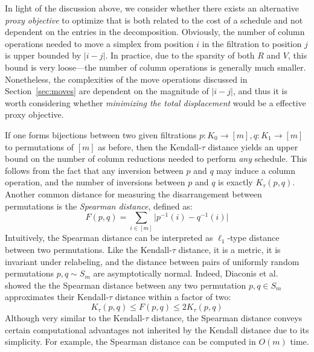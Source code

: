 \documentclass[sn-mathphys]{sn-jnl}
\DeclareMathOperator*{\argmin}{arg\,min}
\begin{document}
In light of the discussion above, we consider whether there exists an alternative \emph{proxy objective} to optimize that is both related to the cost of a schedule and not dependent on the entries in the decomposition. 
Obviously, the number of column operations needed to move a simplex from position $i$ in the filtration to position $j$ is upper bounded by $\lvert i - j \rvert$. In practice, due to the sparsity of both $R$ and $V$, this bound is very loose---the number of column operations is generally much smaller. Nonetheless, the complexities of the move operations discussed in Section~\ref{sec:moves} are dependent on the magnitude of $\lvert i - j \rvert$, and thus it is worth considering whether  \emph{minimizing the total displacement} would be a effective proxy objective. 

If one forms bijections between two given filtrations $p: K_0 \to [m], q: K_1 \to [m]$ to permutations of $[m]$ as before, then the Kendall-$\tau$ distance yields an upper bound on the number of column reductions needed to perform \emph{any} schedule. This follows from the fact that any inversion between $p$ and $q$ may induce a column operation, and the number of inversions between $p$ and $q$ is exactly $K_{\tau}(p, q)$. Another common distance for measuring the disarrangement between permutations is the \emph{Spearman distance}, defined as:
\begin{equation}\label{eq:spearman_dist}
F(p, q) = \sum\limits_{i \in [m]} \lvert p^{-1}(i) - q^{-1}(i) \rvert
\end{equation}
Intuitively, the Spearman distance can be interpreted as $\ell_1$-type distance between two permutations. Like the Kendall-$\tau$ distance, it is a metric, it is invariant under relabeling, and the distance between pairs of uniformly random permutations $p, q \sim S_m$ are asymptotically normal. Indeed, Diaconis et al.~\cite{diaconis1977spearman} showed the the Spearman distance between any two permutation $p, q \in S_m$ approximates their Kendall-$\tau$ distance within a factor of two: 
\begin{equation}\label{eq:diaconis_inequality}
K_\tau(p, q) \leq F(p, q) \leq 2 K_\tau(p, q)
\end{equation}
Although very similar to the Kendall-$\tau$ distance, the Spearman distance conveys certain computational advantages not inherited by the Kendall distance due to its simplicity. 
For example, the Spearman distance can be computed in $O(m)$ time.

\end{document}
